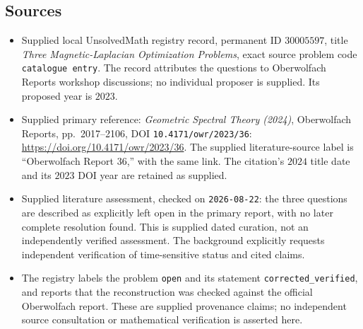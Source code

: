 \documentclass[11pt]{article}
\begin{document}
\subsection{Sources}
\begin{itemize}
\item Supplied local UnsolvedMath registry record, permanent ID \(30005597\), title \emph{Three Magnetic-Laplacian Optimization Problems}, exact source problem code \texttt{catalogue entry}. The record attributes the questions to Oberwolfach Reports workshop discussions; no individual proposer is supplied. Its proposed year is \(2023\).
\item Supplied primary reference: \emph{Geometric Spectral Theory (2024)}, Oberwolfach Reports, pp.~2017--2106, DOI \texttt{10.4171/owr/2023/36}: \url{https://doi.org/10.4171/owr/2023/36}. The supplied literature-source label is ``Oberwolfach Report 36,'' with the same link. The citation's \(2024\) title date and its \(2023\) DOI year are retained as supplied.
\item Supplied literature assessment, checked on \texttt{2026-08-22}: the three questions are described as explicitly left open in the primary report, with no later complete resolution found. This is supplied dated curation, not an independently verified assessment. The background explicitly requests independent verification of time-sensitive status and cited claims.
\item The registry labels the problem \texttt{open} and its statement \texttt{corrected\_verified}, and reports that the reconstruction was checked against the official Oberwolfach report. These are supplied provenance claims; no independent source consultation or mathematical verification is asserted here.
\end{itemize}
\end{document}

